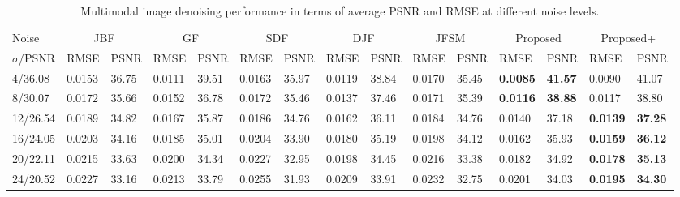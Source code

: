 \documentclass{article}
\begin{document}
\begin{table*}[t]
	\scriptsize
	\centering
	\caption{Multimodal image denoising performance in terms of average PSNR and RMSE at different noise levels.}
	\begin{tabular}{l| ll| ll| ll| ll| ll| ll |ll }
		\hline \hline
		Noise & \multicolumn{2}{c|}{JBF\cite{kopf2007joint}} & \multicolumn{2}{c|}{GF\cite{he2013guided}} & \multicolumn{2}{c|}{SDF\cite{ham2017robust}} & \multicolumn{2}{c|}{DJF\cite{li2016deep}} & \multicolumn{2}{c|}{JFSM\cite{shen2015multispectral}} & \multicolumn{2}{c|}{Proposed} & \multicolumn{2}{c}{Proposed+} \\
		$\sigma$/PSNR & RMSE & PSNR & RMSE & PSNR & RMSE & PSNR & RMSE & PSNR & RMSE & PSNR & RMSE & PSNR & RMSE & PSNR \\
		\hline
		4/36.08 & 0.0153 & 36.75 & 0.0111 & 39.51 & 0.0163 & 35.97 & 0.0119 & 38.84 & 0.0170 & 35.45 & \textbf{0.0085} & \textbf{41.57} & 0.0090 & 41.07 \\
		8/30.07 & 0.0172 & 35.66 & 0.0152 & 36.78 & 0.0172 & 35.46 & 0.0137 & 37.46 & 0.0171 & 35.39 & \textbf{0.0116} & \textbf{38.88} & 0.0117 & 38.80 \\
		12/26.54 & 0.0189 & 34.82 & 0.0167 & 35.87 & 0.0186 & 34.76 & 0.0162 & 36.11 & 0.0184 & 34.76 & 0.0140 & 37.18 & \textbf{0.0139} & \textbf{37.28} \\
		16/24.05 & 0.0203 & 34.16 & 0.0185 & 35.01 & 0.0204 & 33.90 & 0.0180 & 35.19 & 0.0198 & 34.12 & 0.0162 & 35.93 & \textbf{0.0159} & \textbf{36.12} \\
		20/22.11 & 0.0215 & 33.63 & 0.0200 & 34.34 & 0.0227 & 32.95 & 0.0198 & 34.45 & 0.0216 & 33.38 & 0.0182 & 34.92 & \textbf{0.0178} & \textbf{35.13} \\
		24/20.52 & 0.0227 & 33.16 & 0.0213 & 33.79 & 0.0255 & 31.93 & 0.0209 & 33.91 & 0.0232 & 32.75 & 0.0201 & 34.03 & \textbf{0.0195} & \textbf{34.30} \\
		\hline \hline
	\end{tabular}
	\label{Tab:PSNR_RMSE}
\end{table*}
\end{document}
